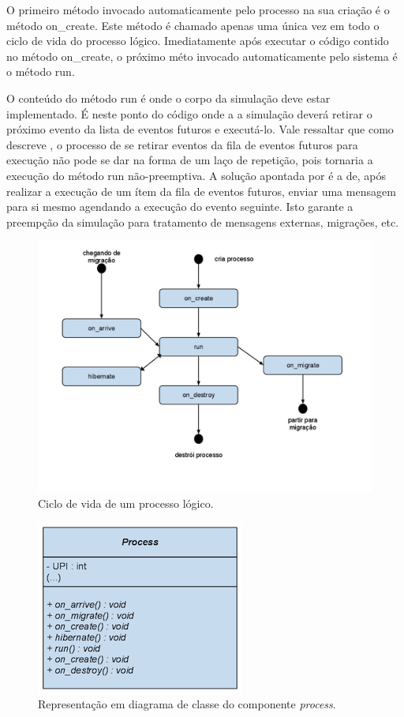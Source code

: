 O primeiro método invocado automaticamente pelo processo na sua criação é o método on\_create. Este método é chamado apenas uma única vez em todo o ciclo de vida do processo lógico. Imediatamente após executar o código contido no método on\_create, o próximo méto invocado automaticamente pelo sistema é o método run.

O conteúdo do método run é onde o corpo da simulação deve estar implementado. É neste ponto do código onde a a simulação deverá retirar o próximo evento da lista de eventos futuros e executá-lo. Vale ressaltar que como descreve \cite{RIBEIROALVES}, o processo de se retirar eventos da fila de eventos futuros para execução não pode se dar na forma de um laço de repetição, pois tornaria a execução do método run não-preemptiva. A solução apontada por \cite{RIBEIROALVES} é a de, após realizar a execução de um ítem da fila de eventos futuros, enviar uma mensagem para si mesmo agendando a execução do evento seguinte. Isto garante a preempção da simulação para tratamento de mensagens externas, migrações, etc.

\begin{figure}
  \centerline{\includegraphics{estados_processos.png}}
  \caption{Ciclo de vida de um processo lógico.}
\label{fig:estados_processos}
\end{figure}

\begin{figure}
  \centerline{\includegraphics{process_uml.png}}
  \caption{Representação em diagrama de classe do componente \textit{process}.}
\label{fig:process_uml}
\end{figure}

